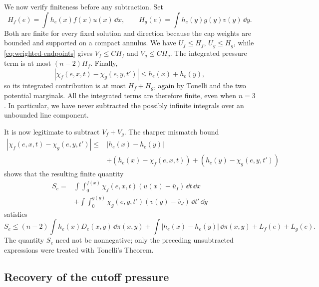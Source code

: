 We now verify finiteness before any subtraction.  Set
\[
 H_f(e)=\int h_e(x)f(x)u(x)\,\dd x,
 \qquad H_g(e)=\int h_e(y)g(y)v(y)\,\dd y.
\]
Both are finite for every fixed solution and direction because the
cap weights are bounded and supported on a compact annulus.
We have $U_f\le H_f$, $U_g\le H_g$, while
\eqref{eq:weighted-endpoints} gives $V_f\le C H_f$ and
$V_g\le C H_g$.  The integrated pressure term is at most
$(n-2)H_f$.  Finally,
\[
 |\chi_f(e,x,t)-\chi_g(e,y,t')|\le h_e(x)+h_e(y),
\]
so its integrated contribution is at most $H_f+H_g$, again by
Tonelli and the two potential marginals.  All the integrated terms
are therefore finite, even when $n=3$.  In particular, we have
never subtracted the possibly infinite integrals over an unbounded
line component.

It is now legitimate to subtract $V_f+V_g$.  The sharper mismatch
bound
\begin{align*}
 |\chi_f(e,x,t)-\chi_g(e,y,t')|
 \le{}&|h_e(x)-h_e(y)|\\
      &+(h_e(x)-\chi_f(e,x,t))
        +(h_e(y)-\chi_g(e,y,t'))
\end{align*}
shows that the resulting finite quantity
\[
\begin{split}
 S_e={}&\int\int_0^{f(x)}\chi_f(e,x,t)(u(x)-\overline u_I)\,\dd t\,\dd x\\
   &+\int\int_0^{g(y)}\chi_g(e,y,t')(v(y)-\overline v_J)\,\dd t'\,\dd y
\end{split}
\]
satisfies
\begin{equation}\label{eq:integrated-pressure}
 S_e\le(n-2)\int h_e(x)D_e(x,y)\,\dd\pi(x,y)
       +\int|h_e(x)-h_e(y)|\,\dd\pi(x,y)+L_f(e)+L_g(e).
\end{equation}
The quantity $S_e$ need not be nonnegative; only the preceding
unsubtracted expressions were treated with Tonelli's Theorem.

\subsection{Recovery of the cutoff pressure}

